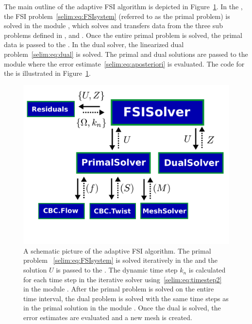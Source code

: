 The main outline of the adaptive FSI algorithm is depicted in
Figure~\ref{selim:fig:adaptiveMAP}. In the , the FSI
problem~\eqref{selim:eq:FSIsystem} (referred to as the primal problem)
is solved in the module , which solves and
transfers data from the three sub problems defined in
,  and . Once
the entire primal problem is solved, the primal data is passed to the
. In the dual solver, the linearized dual
problem~\eqref{selim:eq:dual} is solved. The primal and dual solutions
are passed to the module  where the error
estimate~\eqref{selim:eq:aposteriori} is evaluated. The code for the
 is illustrated in
Figure~\ref{selim:fig:adaptiveMAP}.
\begin{figure}
\label{selim:fig:adaptiveMAP}
\includegraphics[width=1.0\textwidth]{chapters/selim/pdf/adaptive.pdf}
\caption{A schematic picture of the adaptive FSI algorithm. The primal
  problem ~\eqref{selim:eq:FSIsystem} is solved iteratively in the
   and the solution $U$ is passed to the
  . The dynamic time step $k_n$ is calculated for
  each time step in the iterative solver 
  using~\eqref{selim:eq:timestep2} in the module
  . After the primal problem is solved on the entire
  time interval, the dual problem is solved with the same time steps
  as in the primal solution in the module . Once
  the dual is solved, the error estimates are evaluated and a new mesh
  is created.}
\end{figure}

